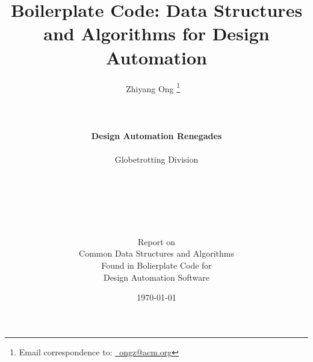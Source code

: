 \documentclass[letterpaper,12pt]{report}
\begin{document}










%
%
\title{\Huge \bf Boilerplate Code: Data Structures and Algorithms for Design Automation}

\date{\today}

\author{{\LARGE Zhiyang Ong}
\thanks{Email correspondence to: \href{mailto:ongz@acm.org}{\Email\ ongz@acm.org}}
\ \\
\vspace{-4.0in}
\ \\
\ \\
\ \\
{\bf \LARGE
	Design Automation Renegades
	\vspace{0.1cm}} \\
\hline
\ \\
{\Large \sc Globetrotting Division} \\
\ \\
\ \\
\ \\
\ \\
\ \\
\vspace{2.0in}
\ \\
{\large \sc Report on } \\
{\large Common Data Structures and Algorithms} \\
{\large Found in Bolierplate Code for} \\
{\large Design Automation Software}
}

\maketitle
\end{document}
